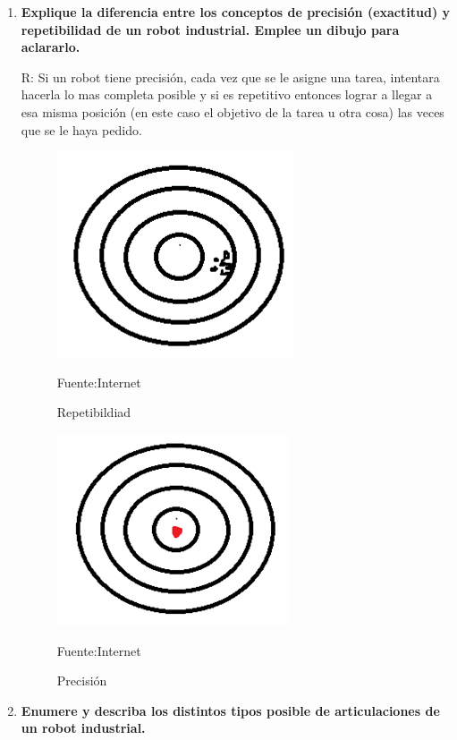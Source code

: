 \begin{enumerate}
\begin{itemize}
    \end{itemize}

    \item \textbf{Explique la diferencia entre los conceptos de precisión (exactitud)  y repetibilidad de un robot industrial. Emplee un dibujo para aclararlo. }
    
    R: Si un robot tiene precisión, cada vez que se le asigne una tarea, intentara hacerla lo mas completa posible y si es repetitivo entonces lograr a llegar a esa misma posición (en este caso el objetivo de la tarea u otra cosa) las veces que se le haya pedido.

    \begin{figure}[H]
        \centering
        \includegraphics[scale = 0.5]{Imagenes/repeti.png}
        \caption{Repetibildiad}{Fuente:Internet}
    \end{figure}

    \begin{figure}[H]
        \centering
        \includegraphics[scale = 0.5]{Imagenes/presicion.png}
        \caption{Precisión}{Fuente:Internet}
    \end{figure}

    \item \textbf{Enumere y describa los distintos tipos posible de articulaciones de un robot industrial.}
    

\end{enumerate}
